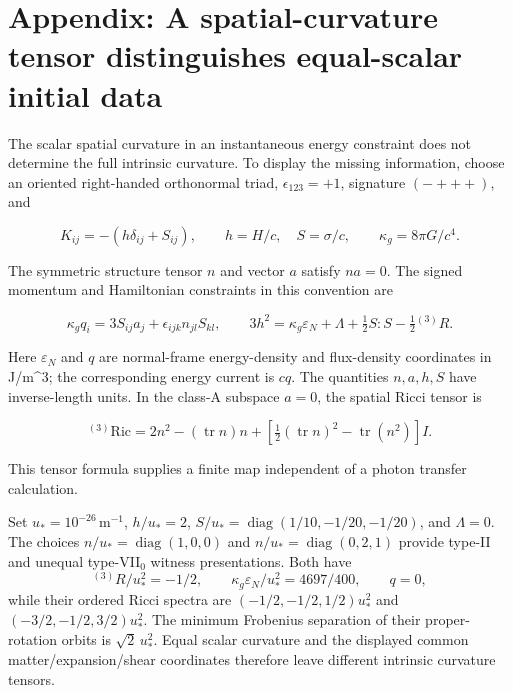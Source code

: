 \section*{Appendix: A spatial-curvature tensor distinguishes equal-scalar initial data}
The scalar spatial curvature in an instantaneous energy constraint does
not determine the full intrinsic curvature. To display the missing
information, choose an oriented right-handed orthonormal triad,
\(\epsilon_{123}=+1\), signature \((-+++ )\), and

\begin{equation}
K_{ij}=-(h\delta_{ij}+S_{ij}),\qquad h=H/c,\quad S=\sigma/c,
 \qquad \kappa_g=8\pi G/c^4.\tag{A1}
\end{equation}

The symmetric structure tensor \(n\) and vector \(a\) satisfy \(na=0\).
The signed momentum and Hamiltonian constraints in this convention are

\begin{equation}
\kappa_g q_i=3S_{ij}a_j+\epsilon_{ijk}n_{jl}S_{kl},\qquad
 3h^2=\kappa_g\varepsilon_N+\Lambda+\tfrac12S:S-\tfrac12{}^{(3)}R.\tag{A2}
\end{equation}

Here \(\varepsilon_N\) and \(q\) are normal-frame energy-density and
flux-density coordinates in J/m\^{}3; the corresponding energy current
is \(cq\). The quantities \(n,a,h,S\) have inverse-length units. In the
class-A subspace \(a=0\), the spatial Ricci tensor is

\begin{equation}
{}^{(3)}\!\mathrm{Ric}
 =2n^2-(\operatorname{tr}n)n+
 [\tfrac12(\operatorname{tr}n)^2-\operatorname{tr}(n^2)]I.\tag{A3}
\end{equation}

This tensor formula supplies a finite map independent of a photon
transfer calculation.

Set \(u_*=10^{-26}\,\mathrm{m}^{-1}\), \(h/u_*=2\),
\(S/u_*=\operatorname{diag}(1/10,-1/20,-1/20)\), and \(\Lambda=0\). The
choices \(n/u_*=\operatorname{diag}(1,0,0)\) and
\(n/u_*=\operatorname{diag}(0,2,1)\) provide type-II and unequal
type-VII\(_0\) witness presentations. Both have \begin{equation}
{}^{(3)}R/u_*^2=-1/2,\qquad
 \kappa_g\varepsilon_N/u_*^2=4697/400,\qquad q=0,\tag{A4}
\end{equation} while their ordered Ricci spectra are \((-1/2,-1/2,1/2)u_*^2\) and
\((-3/2,-1/2,3/2)u_*^2\). The minimum Frobenius separation of their
proper-rotation orbits is \(\sqrt2\,u_*^2\). Equal scalar curvature and
the displayed common matter/expansion/shear coordinates therefore leave
different intrinsic curvature tensors.

